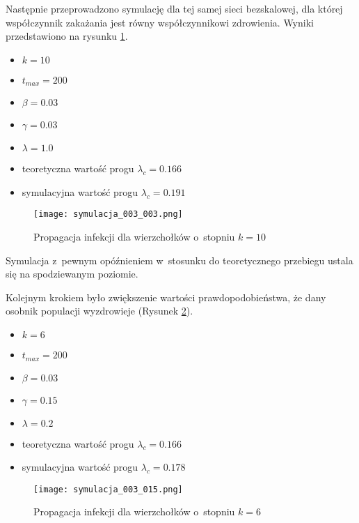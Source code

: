 \begin{enumerate}

Następnie przeprowadzono symulację dla tej samej sieci bezskalowej, dla której współczynnik zakażania jest równy współczynnikowi zdrowienia. Wyniki przedstawiono na rysunku \ref{fig:symulacja_003_003.png}.
\begin{itemize}[nolistsep]
\item $k = 10$
\item $t_{max} = 200$
\item $\beta = 0.03$
\item $\gamma = 0.03$
\item $\lambda = 1.0$
\item teoretyczna wartość progu $\lambda_c = 0.166$
\item symulacyjna wartość progu $\lambda_c = 0.191$
\end{itemize}

\begin{figure}[H]
\centering
\texttt{[image: symulacja\_003\_003.png]}
\caption{\small Propagacja infekcji dla wierzchołków o~stopniu $k=10$}
\label{fig:symulacja_003_003.png}
\end{figure}

Symulacja z~pewnym opóźnieniem w~stosunku do teoretycznego przebiegu ustala się na spodziewanym poziomie.

Kolejnym krokiem było zwiększenie wartości prawdopodobieństwa, że dany osobnik populacji wyzdrowieje (Rysunek \ref{fig:symulacja_003_015.png}).
\begin{itemize}[nolistsep]
\item $k = 6$
\item $t_{max} = 200$
\item $\beta = 0.03$
\item $\gamma = 0.15$
\item $\lambda = 0.2$
\item teoretyczna wartość progu $\lambda_c = 0.166$
\item symulacyjna wartość progu $\lambda_c = 0.178$
\end{itemize}

\begin{figure}[H]
\centering
\texttt{[image: symulacja\_003\_015.png]}
\caption{\small Propagacja infekcji dla wierzchołków o~stopniu $k=6$}
\label{fig:symulacja_003_015.png}
\end{figure}


\end{enumerate}
